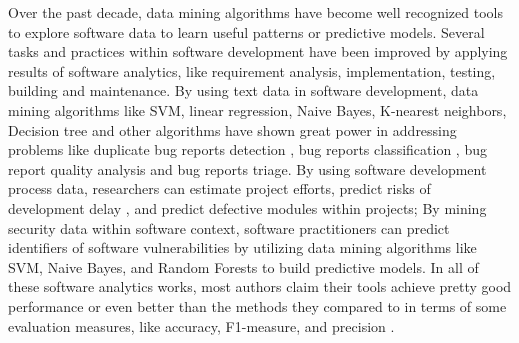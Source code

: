  Over the past decade, data mining algorithms have become well
 recognized tools to explore software data to learn useful patterns or predictive
 models. Several tasks and practices within software development have been
 improved by applying results of software analytics, like requirement analysis, implementation,
 testing, building and maintenance\cite{xie2009data}.
By using text data in software development, data mining algorithms like SVM, 
linear regression, Naive Bayes, K-nearest neighbors, Decision tree and other
algorithms have shown great power in addressing problems like
duplicate bug reports detection \cite{sun2010discriminative,jalbert2008automated,alipour2013contextual,nguyen2012duplicate},
bug reports classification \cite{antoniol2008bug,zanetti2013categorizing,lamkanfi2011comparing,tian2013drone}, 
bug report quality analysis \cite{bettenburg2008makes} and bug reports
triage\cite{anvik2006should, bhattacharya2010fine, lin2009empirical}. 
By using software development process data,
researchers can estimate project efforts\cite{dejaeger2012data,kocaguneli2012value, menzies2013local},
predict risks of development delay \cite{da2014empirical,choetkiertikul2015predicting}, 
and predict defective modules within projects\cite{me07b,hall11,lessmann2008benchmarking};
By mining security data within software context, software practitioners can predict identifiers of software vulnerabilities\cite{shin2011evaluating,scandariato2012predicting,medeiros2014automatic} by utilizing data mining algorithms like SVM, Naive Bayes, and
Random Forests to build 
predictive models. In all of these software analytics works,  most authors claim
their tools achieve pretty good performance or even better than the methods they compared to in terms
of some evaluation measures, like accuracy, F1-measure, and precision \cite{lamkanfi2011comparing, alipour2013contextual,lin2009empirical,lessmann2008benchmarking,hall11}.


